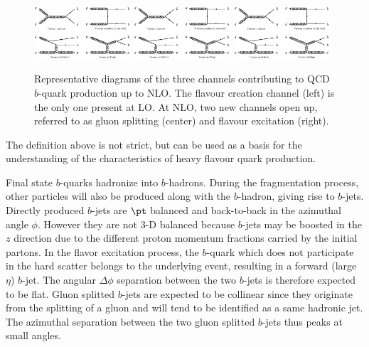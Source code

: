 %
\begin{figure}[h!]
\centering
\includegraphics[width=0.32\textwidth,viewport=0 880 1500 1600,clip]{FIGS/bb_diagrams.jpg}
\includegraphics[width=0.32\textwidth,viewport=1600 0 3100 820,clip]{FIGS/bb_diagrams.jpg}
\includegraphics[width=0.32\textwidth,viewport=0 0 1500 820,clip]{FIGS/bb_diagrams.jpg}
\caption{Representative diagrams of the three channels contributing to QCD $b$-quark production up to NLO. The flavour creation channel (left) is the only one present at LO. At NLO, two new channels open up, referred to as gluon splitting (center) and  flavour excitation (right).}
\label{fig:qcd_diagrams}
\end{figure}
%

The definition above is not strict, but can be used as a basis for the understanding of the characteristics of heavy flavour quark production.

Final state $b$-quarks hadronize into $b$-hadrons. During the fragmentation process, other particles will also be produced along with the $b$-hadron, giving rise to $b$-jets. Directly produced $b$-jets are $\pt$ balanced and back-to-back in the azimuthal angle $\phi$. However they are not 3-D balanced because $b$-jets may be boosted in the $z$ direction due to the different proton momentum fractions carried by the initial partons.  In the flavor excitation process, the $b$-quark which does not participate in the hard scatter belongs to the underlying event, resulting in a forward (large $\eta$) $b$-jet.  The angular $\Delta \phi$ separation between the two $b$-jets is therefore expected to be flat.  Gluon splitted $b$-jets are expected to be collinear since they originate from the splitting of a gluon and will tend to be identified as a same hadronic jet. The azimuthal separation between the two gluon splitted $b$-jets thus peaks at small angles.



